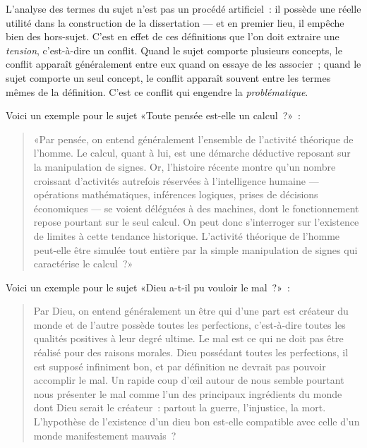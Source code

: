 \documentclass[a4paper,11pt]{article}
\newcommand{\cad}{c'est-à-dire}
\begin{document}
L'analyse des termes du sujet n'est pas un procédé artificiel~: il
possède une réelle utilité dans la construction de la dissertation ---
et en premier lieu, il empêche bien des hors-sujet. C'est en effet de
ces définitions que l'on doit extraire une \emph{tension}, \cad{} un
conflit. Quand le sujet comporte plusieurs concepts, le conflit apparaît
généralement entre eux quand on essaye de les associer~; quand le sujet
comporte un seul concept, le conflit apparaît souvent entre les termes
mêmes de la définition. C'est ce conflit qui engendre la
\emph{problématique}.

\par

Voici un exemple pour le sujet «Toute pensée est-elle un calcul~?»~:
\begin{quote}
  «Par pensée, on entend généralement l'ensemble de l'activité théorique
  de l'homme. Le calcul, quant à lui, est une démarche déductive
  reposant sur la manipulation de signes. Or, l'histoire récente montre
  qu'un nombre croissant d'activités autrefois réservées à
  l'intelligence humaine --- opérations mathématiques, inférences
  logiques, prises de décisions économiques --- se voient déléguées à
  des machines, dont le fonctionnement repose pourtant sur le seul
  calcul. On peut donc s'interroger sur l'existence de limites à cette
  tendance historique. L'activité théorique de l'homme peut-elle être
  simulée tout entière par la simple manipulation de signes qui
  caractérise le calcul~?»
\end{quote}

\par

Voici un exemple pour le sujet «Dieu a-t-il pu vouloir le mal~?»~:
\begin{quote}
  Par Dieu, on entend généralement un être qui d'une part est créateur
  du monde et de l'autre possède toutes les perfections, c'est-à-dire
  toutes les qualités positives à leur degré ultime. Le mal est ce qui
  ne doit pas être réalisé pour des raisons morales. Dieu possédant
  toutes les perfections, il est supposé infiniment bon, et par
  définition ne devrait pas pouvoir accomplir le mal. Un rapide coup
  d'œil autour de nous semble pourtant nous présenter le mal comme l'un
  des principaux ingrédients du monde dont Dieu serait le créateur~:
  partout la guerre, l'injustice, la mort. L'hypothèse de l'existence
  d'un dieu bon est-elle compatible avec celle d'un monde manifestement
  mauvais~?
\end{quote}
\end{document}
